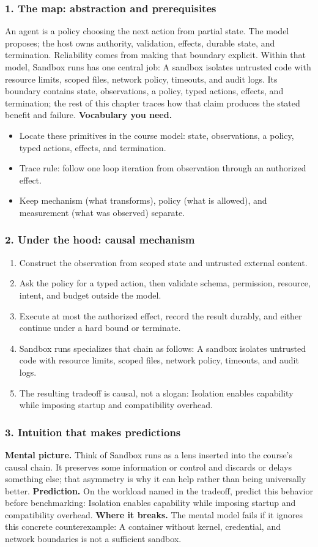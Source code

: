 \subsubsection*{1. The map: abstraction and prerequisites}
An agent is a policy choosing the next action from partial state. The model proposes; the host owns authority, validation, effects, durable state, and termination. Reliability comes from making that boundary explicit.
Within that model, Sandbox runs has one central job: A sandbox isolates untrusted code with resource limits, scoped files, network policy, timeouts, and audit logs. Its boundary contains state, observations, a policy, typed actions, effects, and termination; the rest of this chapter traces how that claim produces the stated benefit and failure.
\textbf{Vocabulary you need.}\begin{itemize}
\item Locate these primitives in the course model: state, observations, a policy, typed actions, effects, and termination.
\item Trace rule: follow one loop iteration from observation through an authorized effect.
\item Keep mechanism (what transforms), policy (what is allowed), and measurement (what was observed) separate.
\end{itemize}
\subsubsection*{2. Under the hood: causal mechanism}\begin{enumerate}
\item Construct the observation from scoped state and untrusted external content.
\item Ask the policy for a typed action, then validate schema, permission, resource, intent, and budget outside the model.
\item Execute at most the authorized effect, record the result durably, and either continue under a hard bound or terminate.
\item Sandbox runs specializes that chain as follows: A sandbox isolates untrusted code with resource limits, scoped files, network policy, timeouts, and audit logs.
\item The resulting tradeoff is causal, not a slogan: Isolation enables capability while imposing startup and compatibility overhead.
\end{enumerate}
\subsubsection*{3. Intuition that makes predictions}
\textbf{Mental picture.} Think of Sandbox runs as a lens inserted into the course's causal chain. It preserves some information or control and discards or delays something else; that asymmetry is why it can help rather than being universally better.
\textbf{Prediction.} On the workload named in the tradeoff, predict this behavior before benchmarking: Isolation enables capability while imposing startup and compatibility overhead.
\textbf{Where it breaks.} The mental model fails if it ignores this concrete counterexample: A container without kernel, credential, and network boundaries is not a sufficient sandbox.
